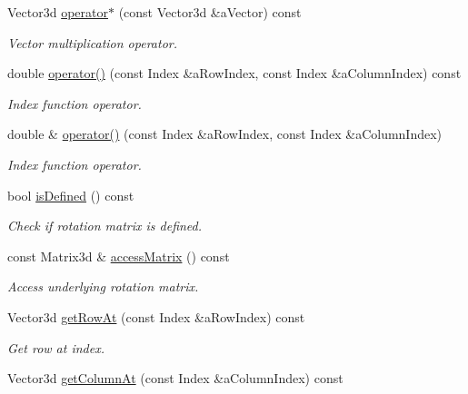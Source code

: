 \begin{DoxyCompactItemize}
Vector3d \hyperlink{classlibrary_1_1math_1_1geom_1_1trf_1_1rot_1_1_rotation_matrix_af4da3ca7389c4126aaf984b6f4340972}{operator$\ast$} (const Vector3d \&a\+Vector) const
\begin{DoxyCompactList}\small\item\em Vector multiplication operator. \end{DoxyCompactList}\item 
double \hyperlink{classlibrary_1_1math_1_1geom_1_1trf_1_1rot_1_1_rotation_matrix_a55edc4e5e8514623bd60f2473ec6e93d}{operator()} (const Index \&a\+Row\+Index, const Index \&a\+Column\+Index) const
\begin{DoxyCompactList}\small\item\em Index function operator. \end{DoxyCompactList}\item 
double \& \hyperlink{classlibrary_1_1math_1_1geom_1_1trf_1_1rot_1_1_rotation_matrix_a09a9da15d503894cf85e47c0b7238a77}{operator()} (const Index \&a\+Row\+Index, const Index \&a\+Column\+Index)
\begin{DoxyCompactList}\small\item\em Index function operator. \end{DoxyCompactList}\item 
bool \hyperlink{classlibrary_1_1math_1_1geom_1_1trf_1_1rot_1_1_rotation_matrix_aa5034776af47fc1eacb77359cef04550}{is\+Defined} () const
\begin{DoxyCompactList}\small\item\em Check if rotation matrix is defined. \end{DoxyCompactList}\item 
const Matrix3d \& \hyperlink{classlibrary_1_1math_1_1geom_1_1trf_1_1rot_1_1_rotation_matrix_a957387a407da1658fa63dc6692254175}{access\+Matrix} () const
\begin{DoxyCompactList}\small\item\em Access underlying rotation matrix. \end{DoxyCompactList}\item 
Vector3d \hyperlink{classlibrary_1_1math_1_1geom_1_1trf_1_1rot_1_1_rotation_matrix_a71dca1f50f8073256ff69bb365c3a772}{get\+Row\+At} (const Index \&a\+Row\+Index) const
\begin{DoxyCompactList}\small\item\em Get row at index. \end{DoxyCompactList}\item 
Vector3d \hyperlink{classlibrary_1_1math_1_1geom_1_1trf_1_1rot_1_1_rotation_matrix_a637e10366c51b6e2137b1454522c5c07}{get\+Column\+At} (const Index \&a\+Column\+Index) const

\end{DoxyCompactItemize}
